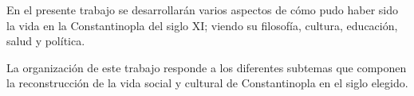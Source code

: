 En el presente trabajo se desarrollarán varios aspectos de cómo 
pudo haber sido la vida en la Constantinopla del siglo XI; viendo 
su filosofía, cultura, educación, salud y política. 

La organización de este trabajo responde a los diferentes
subtemas que componen la reconstrucción de la vida social y
cultural de Constantinopla en el siglo elegido.


